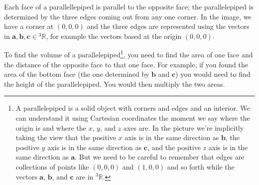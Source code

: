 \documentclass[10pt,answers]{exam}
\newcommand{\R}{\mathbb{R}}
\newcommand{\ba}{\mathbf{a}}
\newcommand{\bb}{\mathbf{b}}
\newcommand{\bc}{\mathbf{c}}
\newcommand{\T}{ \mathbf{{T}}}
\renewcommand{\det}{\operatorname{det}\,}
\begin{document}
\begin{questions}
    \begin{minipage}{.6\textwidth}
      Each face of a parallellepiped is parallel to the opposite face; the
      parallelepiped is determined by the three edges coming out from any one
      corner.  In the image, we have a corner at $(0,0,0)$ and the three edges are
      represented using the vectors in $\ba, \bb, \bc \in {^3}\R$, for example the
      vectors based at the origin $(0,0,0)$.
    \end{minipage}
    \begin{minipage}{.35\textwidth}
      \flushright{}
    \end{minipage}
    
    
    To find the volume of a parallelepiped\footnote{A parallelepiped is a solid
      object with corners and edges and an interior.  We can understand it using
      Cartesian coordinates the moment we say where the origin is and where the
      $x$, $y$, and $z$ axes are.  In the picture we're implicitly taking the
      view that the positive $x$ axis is in the same direction as $\bb$, the
      positive $y$ axis is in the same direction as $\bc$, and the positive $z$
      axis is in the same direction as $\ba$.  But we need to be careful to
      remember that edges are collections of points like $(0,0,0)$ and $(1,0,0)$
      and so forth while the vectors $\ba$, $\bb$, and $\bc$ are in $^3\R$.},
    you need to find the area of one face and the distance of the opposite face
    to that one face.  For example, if you found the area of the bottom face
    (the one determined by $\bb$ and $\bc$) you would need to find the height of
    the parallelepiped.  You would then multiply the two areas.
    
\end{questions}
\end{document}
